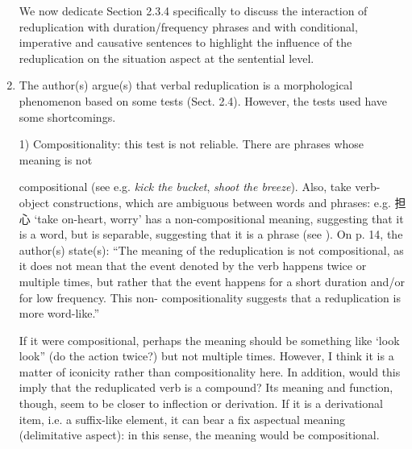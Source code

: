 \documentclass[fleqn,twoside]{article}
\begin{document}
\begin{enumerate}
We now  dedicate Section 2.3.4 specifically to discuss the interaction of reduplication with duration\slash frequency phrases and with conditional, imperative and causative sentences 
to highlight the influence of the reduplication on the situation aspect at the sentential level.

\item
The author(s) argue(s) that verbal reduplication is a morphological phenomenon based on some tests (Sect. 2.4). However, the tests used have some shortcomings.

1) Compositionality: this test is not reliable. There are phrases whose meaning is not

compositional (see e.g. \textit{kick the bucket}, \textit{shoot the breeze}). Also, take verb-object constructions,
which are ambiguous between words and phrases: e.g. 担心  `take on-heart, worry' has a
non-compositional meaning, suggesting that it is a word, but is separable, suggesting that it is a
phrase (see \citealt{Huang1984}). 
On p. 14, the author(s) state(s): “The meaning of the reduplication is not
compositional, as it does not mean that the event denoted by the verb happens twice or multiple
times, but rather that the event happens for a short duration and/or for low frequency. This non-
compositionality suggests that a reduplication is more word-like.”

If it were compositional, perhaps the meaning should be something like ‘look look” (do the action twice?) but not multiple times. However, I think it is a matter of iconicity rather than compositionality here. In addition, would this imply that the reduplicated verb is a compound? Its meaning and function, though, seem to be closer to inflection or derivation. If it is a derivational item, i.e. a suffix-like element, it can bear a fix aspectual meaning (delimitative aspect): in this sense, the meaning would be compositional.


\end{enumerate}
\end{document}
